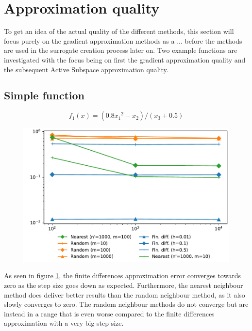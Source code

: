 \documentclass[
  a4paper,  %
  twoside,  %
  bibliography=totoc,
  headsepline,
  cleardoublepage=empty,
  parskip=half,
  draft=false
]{scrbook}
\begin{document}
\section{Approximation quality}

To get an idea of the actual quality of the different methods, this section will focus purely on the gradient approximation methods as a ... before the methods are used in the surrogate creation process later on.
Two example functions are investigated with the focus being on first the gradient approximation quality and the subsequent Active Subspace approximation quality.

\newpage

\subsection{Simple function}

\begin{equation}
f_1(x)=(0.8 {x_1}^2 - x_2) / (x_3 + 0.5)
\nonumber
\end{equation}

\begin{figure}[H]
\begin{center}
	\includegraphics[width=\textwidth]{graphics/as_grad_errors_f1}
\end{center}
	\label{fig:as_grad_errors_f1}
\end{figure}

As seen in figure \ref{fig:as_grad_errors_f1}, the finite differences approximation error converges towards zero as the step size goes down as expected.
Furthermore, the nearest neighbour method does deliver better results than the random neighbour method, as it also slowly converges to zero.
The random neighbour methods do not converge but are instead in a range that is even worse compared to the finite differences approximation with a very big step size.
\end{document}
